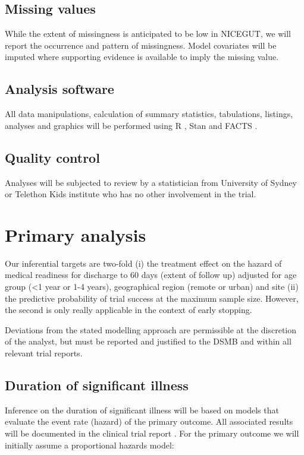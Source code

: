 \documentclass[a4paper]{article}
\begin{document}
\subsection{Missing values}

While the extent of missingness is anticipated to be low in NICEGUT, we will report the occurrence and pattern of missingness.
Model covariates will be imputed where supporting evidence is available to imply the missing value.

\subsection{Analysis software}

All data manipulations, calculation of summary statistics, tabulations, listings, analyses and graphics will be performed using R \cite{R}, Stan \cite{Carpenter2017, RStan} and FACTS \cite{facts}.

\subsection{Quality control}

Analyses will be subjected to review by a statistician from University of Sydney or Telethon Kids institute who has no other involvement in the trial.

\section{Primary analysis}\label{primary-analysis}

Our inferential targets are two-fold (i) the treatment effect on the hazard of medical readiness for discharge to 60 days (extent of follow up) adjusted for age group (<1 year or 1-4 years), geographical region (remote or urban) and site (ii) the predictive probability of trial success at the maximum sample size.
However, the second is only really applicable in the context of early stopping.

Deviations from the stated modelling approach are permissible at the discretion of the analyst, but must be reported and justified to the DSMB and within all relevant trial reports.

\subsection{Duration of significant illness}

Inference on the duration of significant illness will be based on models that evaluate the event rate (hazard) of the primary outcome.
All associated results will be documented in the clinical trial report \cite{fda1996}.
For the primary outcome we will initially assume a proportional hazards model:
\end{document}
